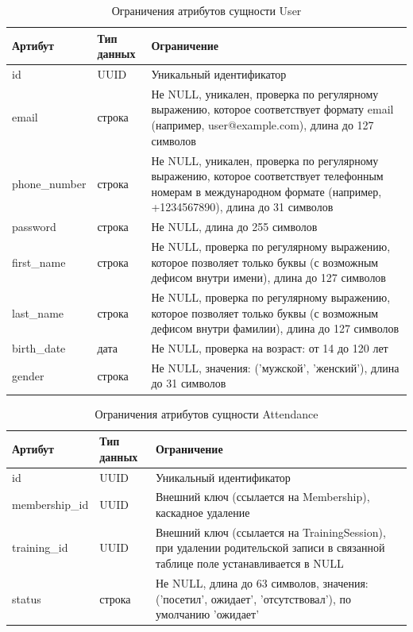 \begin{table}[H]
	\centering
	\begin{tabular}{|p{3.5cm}|p{3.5cm}|p{8.5cm}|}
		\hline
		\textbf{Артибут}             & \textbf{Тип данных}   & \textbf{Ограничение}             \\ \hline
		id                            & UUID                  & Уникальный идентификатор         \\ \hline
		email                         & строка                 & Не NULL, уникален, проверка по регулярному выражению, которое соответствует формату email (например, user@example.com), длина до 127 символов \\ \hline
		phone\_number                 & строка                 & Не NULL, уникален, проверка по регулярному выражению, которое соответствует телефонным номерам в международном формате (например, +1234567890), длина до 31 символов \\ \hline
		password                      & строка                 & Не NULL, длина до 255 символов                        \\ \hline
		first\_name                   & строка                 & Не NULL, проверка по регулярному выражению, которое позволяет только буквы (с возможным дефисом внутри имени), длина до 127 символов \\ \hline
		last\_name                    & строка                 & Не NULL, проверка по регулярному выражению, которое позволяет только буквы (с возможным дефисом внутри фамилии), длина до 127 символов \\ \hline
		birth\_date                   & дата                   & Не NULL, проверка на возраст: от 14 до 120 лет \\ \hline
		gender                        & строка                 & Не NULL, значения: ('мужской', 'женский'), длина до 31 символов \\ \hline
	\end{tabular}
	\caption{Ограничения атрибутов сущности User}
\end{table}

\begin{table}[H]
	\centering
	\begin{tabular}{|p{3.5cm}|p{3.5cm}|p{8.5cm}|}
		\hline
		\textbf{Артибут}             & \textbf{Тип данных}   & \textbf{Ограничение}             \\ \hline
		id                            & UUID                 & Уникальный идентификатор         \\ \hline
		membership\_id                & UUID                  & Внешний ключ (ссылается на Membership), каскадное удаление \\ \hline
		training\_id         & UUID                  & Внешний ключ (ссылается на TrainingSession), при удалении родительской записи в связанной таблице поле устанавливается в NULL \\ \hline
		status         & строка                 & Не NULL, длина до 63 символов, значения: ('посетил', ожидает', 'отсутствовал'), по умолчанию 'ожидает'\\ \hline
	\end{tabular}
	\caption{Ограничения атрибутов сущности Attendance}
\end{table}

